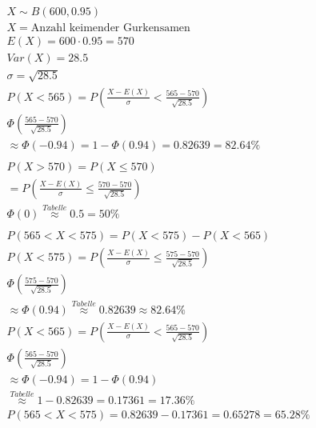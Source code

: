 \begin{align*}
    X \sim B(600, 0.95)                                                                   \\
    X = \text{Anzahl keimender Gurkensamen}                                               \\
    E(X) = 600 \cdot 0.95 = 570                                                           \\
    Var(X) = 28.5                                                                         \\
    \sigma = \sqrt{28.5}                                                                  \\
    P(X < 565) = P\left(\frac{X - E(X)}{\sigma} < \frac{565 - 570}{\sqrt{28.5}}\right)    \\
    \Phi\left(\frac{565 - 570}{\sqrt{28.5}}\right)                                        \\
    \approx \Phi(-0.94) = 1 - \Phi(0.94) = 0.82639 = 82.64\%                              \\\\
    P(X > 570) = P(X \leq 570)                                                            \\
    = P\left(\frac{X - E(X)}{\sigma} \leq \frac{570 - 570}{\sqrt{28.5}}\right)            \\
    \Phi(0) \overset{Tabelle}{\approx} 0.5 = 50\%                                         \\\\
    P(565 < X < 575) = P(X < 575) - P(X < 565)                                            \\
    P(X < 575) = P\left(\frac{X - E(X)}{\sigma} \leq \frac{575 - 570}{\sqrt{28.5}}\right) \\
    \Phi\left(\frac{575 - 570}{\sqrt{28.5}}\right)                                        \\
    \approx \Phi(0.94) \overset{Tabelle}{\approx} 0.82639 \approx 82.64 \%                \\
    P(X < 565) = P\left(\frac{X - E(X)}{\sigma} < \frac{565 - 570}{\sqrt{28.5}}\right)    \\
    \Phi\left(\frac{565 - 570}{\sqrt{28.5}}\right)                                        \\
    \approx \Phi(-0.94) = 1 - \Phi(0.94)                                                  \\
    \overset{Tabelle}{\approx} 1 - 0.82639 = 0.17361 = 17.36\%                            \\
    P(565 < X < 575) = 0.82639 - 0.17361 = 0.65278 = 65.28\%
\end{align*}